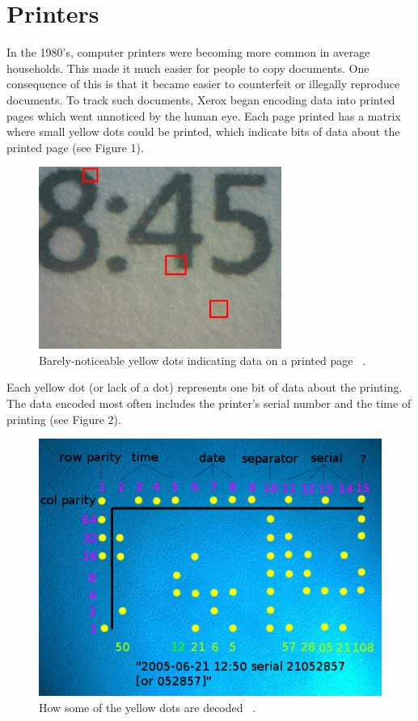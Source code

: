 \section{Printers}  
	In the 1980's, computer printers were becoming more common in average households. This made it much easier for people to copy documents. One consequence of this is that it became easier to counterfeit or illegally reproduce documents. To track such documents, Xerox began encoding data into printed pages which went unnoticed by the human eye. Each page printed has a matrix where small yellow dots could be printed, which indicate bits of data about the printed page (see Figure 1). 
\begin{figure}[h]
\caption{Barely-noticeable yellow dots indicating data on a printed page ~\cite{wikiuser}.}
\centering
\includegraphics[scale=1.06]{fig1}
\end{figure}
	Each yellow dot (or lack of a dot) represents one bit of data about the printing. The data encoded most often includes the printer's serial number and the time of printing (see Figure 2). 
\begin{figure}[h]
\caption{How some of the yellow dots are decoded ~\cite{EFF}.}
\centering
\includegraphics[scale=.47]{fig2}
\end{figure}
